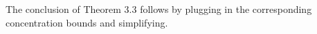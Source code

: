 
The conclusion of Theorem 3.3
follows by plugging in the corresponding concentration bounds and simplifying.

























